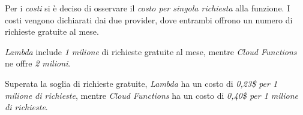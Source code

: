 Per i \textit{costi} si è deciso di osservare il \textit{costo per singola richiesta} alla funzione. I costi vengono dichiarati dai due provider, dove entrambi offrono un numero di richieste gratuite al mese.

\textit{Lambda} include \textit{1 milione} di richieste gratuite al mese, mentre \textit{Cloud Functions} ne offre \textit{2 milioni}.

Superata la soglia di richieste gratuite, \textit{Lambda} ha un costo di \textit{0,23\$ per 1 milione di richieste}, mentre \textit{Cloud Functions} ha un costo di \textit{0,40\$ per 1 milione di richieste}.